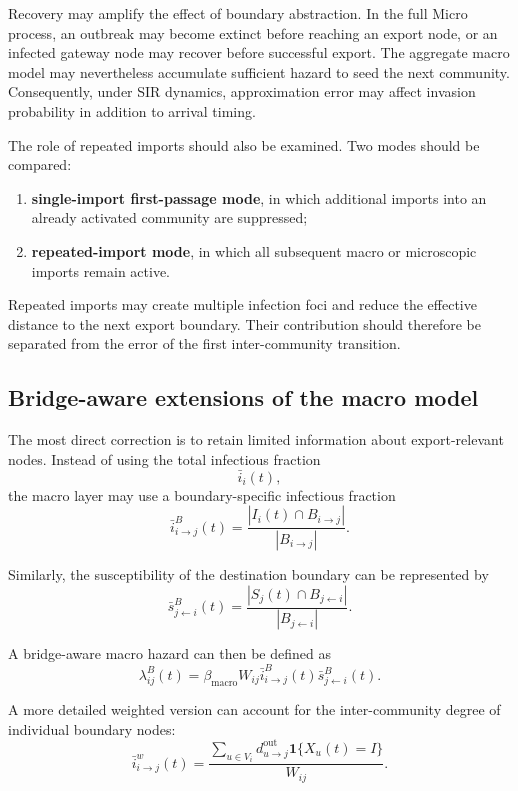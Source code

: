 \documentclass[12pt,a4paper]{article}
\begin{document}
Recovery may amplify the effect of boundary abstraction. In the full Micro process, an outbreak may become extinct before reaching an export node, or an infected gateway node may recover before successful export. The aggregate macro model may nevertheless accumulate sufficient hazard to seed the next community. Consequently, under SIR dynamics, approximation error may affect invasion probability in addition to arrival timing.

The role of repeated imports should also be examined. Two modes should be compared:
\begin{enumerate}
    \item \textbf{single-import first-passage mode}, in which additional imports into an already activated community are suppressed;
    \item \textbf{repeated-import mode}, in which all subsequent macro or microscopic imports remain active.
\end{enumerate}

Repeated imports may create multiple infection foci and reduce the effective distance to the next export boundary. Their contribution should therefore be separated from the error of the first inter-community transition.

\subsection{Bridge-aware extensions of the macro model}

The most direct correction is to retain limited information about export-relevant nodes. Instead of using the total infectious fraction
\[
\bar i_i(t),
\]
the macro layer may use a boundary-specific infectious fraction
\[
\bar i^{B}_{i\rightarrow j}(t)
=
\frac{
\left|
I_i(t)\cap B_{i\rightarrow j}
\right|
}{
|B_{i\rightarrow j}|
}.
\]

Similarly, the susceptibility of the destination boundary can be represented by
\[
\bar s^{B}_{j\leftarrow i}(t)
=
\frac{
\left|
S_j(t)\cap B_{j\leftarrow i}
\right|
}{
|B_{j\leftarrow i}|
}.
\]

A bridge-aware macro hazard can then be defined as
\[
\lambda^{B}_{ij}(t)
=
\beta_{\mathrm{macro}}
W_{ij}
\bar i^{B}_{i\rightarrow j}(t)
\bar s^{B}_{j\leftarrow i}(t).
\]

A more detailed weighted version can account for the inter-community degree of individual boundary nodes:
\[
\bar i^{w}_{i\rightarrow j}(t)
=
\frac{
\sum_{u\in V_i}
d^{\mathrm{out}}_{u\rightarrow j}
\mathbf{1}\{X_u(t)=I\}
}{
W_{ij}
}.
\]
\end{document}
